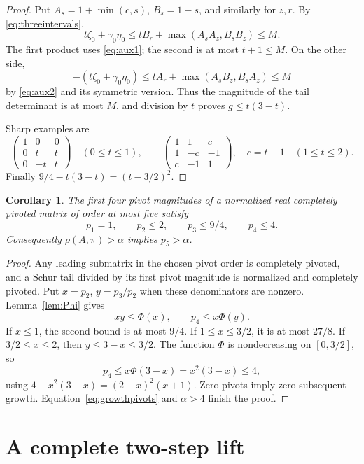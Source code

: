 \documentclass[11pt,reqno]{amsart}
\newtheorem{corollary}[theorem]{Corollary}
\theoremstyle{definition}
\theoremstyle{remark}
\begin{document}
\begin{proof}
Put \(A_s=1+\min(c,s)\), \(B_s=1-s\), and similarly for \(z,r\).
By \eqref{eq:threeintervals},
\[
t\zeta_0+\gamma_0\eta_0
\le tB_r+\max(A_sA_z,B_sB_z)\le M.
\]
The first product uses \eqref{eq:aux1}; the second is at most
\(t+1\le M\). On the other side,
\[
-(t\zeta_0+\gamma_0\eta_0)
\le tA_r+\max(A_sB_z,B_sA_z)\le M
\]
by \eqref{eq:aux2} and its symmetric version.
Thus the magnitude of the tail determinant is at most \(M\), and
division by \(t\) proves \(g\le t(3-t)\).

Sharp examples are
\[
\begin{pmatrix}1&0&0\\0&t&t\\0&-t&t\end{pmatrix}
\quad(0\le t\le1),\qquad
\begin{pmatrix}1&1&c\\1&-c&-1\\c&-1&1\end{pmatrix},
\quad c=t-1\quad(1\le t\le2).
\]
Finally \(9/4-t(3-t)=(t-3/2)^2\).
\end{proof}

\begin{corollary}\label{cor:firstfour}
The first four pivot magnitudes of a normalized real completely pivoted
matrix of order at most five satisfy
\[
p_1=1,\qquad p_2\le2,\qquad p_3\le9/4,\qquad p_4\le4.
\]
Consequently \(\rho(A,\pi)>\alpha\) implies \(p_5>\alpha\).
\end{corollary}

\begin{proof}
Any leading submatrix in the chosen pivot order is completely
pivoted, and a Schur tail divided by its first pivot magnitude is
normalized and completely pivoted. Put \(x=p_2\), \(y=p_3/p_2\)
when these denominators are nonzero. Lemma~\ref{lem:Phi} gives
\[
xy\le\Phi(x),\qquad p_4\le x\Phi(y).
\]
If \(x\le1\), the second bound is at most \(9/4\). If
\(1\le x\le3/2\), it is at most \(27/8\). If \(3/2\le x\le2\),
then \(y\le3-x\le3/2\). The function \(\Phi\) is nondecreasing on
\([0,3/2]\), so
\[
p_4\le x\Phi(3-x)=x^2(3-x)\le4,
\]
using \(4-x^2(3-x)=(2-x)^2(x+1)\).
Zero pivots imply zero subsequent growth.
Equation~\eqref{eq:growthpivots} and \(\alpha>4\) finish the proof.
\end{proof}

\section{A complete two-step lift}\label{sec:lift}
\end{document}
